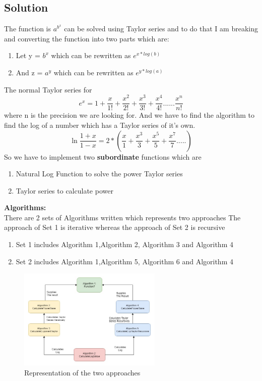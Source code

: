 \documentclass[a4paper, 11pt]{article}
\begin{document}
\subsection{Solution}
The function is $a^{b^x}$ can be solved using Taylor series and to do that I am breaking and converting the function into two parts which are: 
\begin{enumerate}
    \item Let y = $b^x$ which can be rewritten as $e^{x * log(b)}$
    \item And z = $a^y$ which can be rewritten as $e^{y * log(a)}$
\end{enumerate}
The normal Taylor series for 
\begin{equation} \label{exptaylor}
    e^x = 1 + \frac{x}{1!} + \frac{x^2}{2!}  + \frac{x^3}{3!} + \frac{x^4}{4!} ...... \frac{x^n}{n!}
\end{equation}
where n is the precision we are looking for. \newline
And we have to find the algorithm to find the log of a number which has a Taylor series of it's own. \newline
\begin{equation} \label{logtaylor}
\ln{\frac{1+x}{1-x}} = 2 * ( \frac{x}{1} + \frac{x^3}{3} + \frac{x^5}{5} + \frac{x^7}{7}  .....)
\end{equation}
\newline
So we have to implement two \textbf{subordinate} functions which are 
\begin{enumerate}
    \item Natural Log Function to solve the power Taylor series
    \item Taylor series to calculate power
\end{enumerate}
\textbf{Algorithms:}\\
There are 2 sets of Algorithms written which represents two approaches
The approach of Set 1 is iterative whereas the approach of Set 2 is recursive
\begin{enumerate}
    \item Set 1 includes Algorithm 1,Algorithm 2, Algorithm 3 and Algorithm 4
    \item Set 2 includes Algorithm 1,Algorithm 5, Algorithm 6 and Algorithm 4
\end{enumerate}

\begin{figure}[h]
\caption{Representation of the two approaches}
\centering
\includegraphics[width=0.61\textwidth]{Flow.jpg}
\end{figure}
\end{document}
